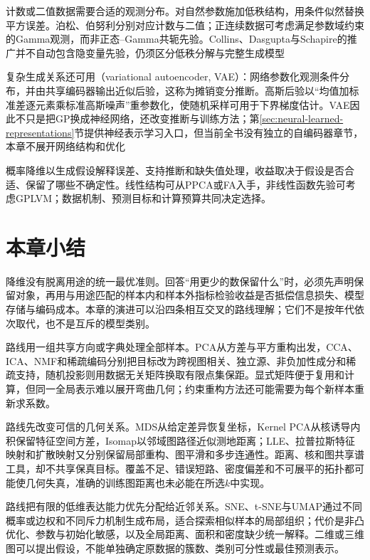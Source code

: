 计数或二值数据需要合适的观测分布。对自然参数施加低秩结构，用条件似然替换平方误差。泊松、伯努利分别对应计数与二值；正连续数据可考虑满足参数域约束的Gamma观测，而非正态--Gamma共轭先验。Collins、Dasgupta与Schapire的推广并不自动包含隐变量先验，仍须区分低秩分解与完整生成模型

复杂生成关系还可用（variational autoencoder, VAE）：网络参数化观测条件分布，并由共享编码器输出近似后验，这称为摊销变分推断。高斯后验以“均值加标准差逐元素乘标准高斯噪声”重参数化，使随机采样可用于下界梯度估计。VAE因此不只是把GP换成神经网络，还改变推断与训练方法；第\ref{sec:neural-learned-representations}节提供神经表示学习入口，但当前全书没有独立的自编码器章节，本章不展开网络结构和优化

概率降维以生成假设解释误差、支持推断和缺失值处理，收益取决于假设是否合适、保留了哪些不确定性。线性结构可从PPCA或FA入手，非线性函数先验可考虑GPLVM；数据机制、预测目标和计算预算共同决定选择。

\section{本章小结}
\label{sec:dim-summary}

降维没有脱离用途的统一最优准则。回答“用更少的数保留什么”时，必须先声明保留对象，再用与用途匹配的样本内和样本外指标检验收益是否抵偿信息损失、模型存储与编码成本。本章的演进可以沿四条相互交叉的路线理解；它们不是按年代依次取代，也不是互斥的模型类别。

路线用一组共享方向或字典处理全部样本。PCA从方差与平方重构出发，CCA、ICA、NMF和稀疏编码分别把目标改为跨视图相关、独立源、非负加性成分和稀疏支持，随机投影则用数据无关矩阵换取有限点集保距。显式矩阵便于复用和计算，但同一全局表示难以展开弯曲几何；约束重构方法还可能需要为每个新样本重新求系数。

路线先改变可信的几何关系。MDS从给定差异恢复坐标，Kernel PCA从核诱导内积保留特征空间方差，Isomap以邻域图路径近似测地距离；LLE、拉普拉斯特征映射和扩散映射又分别保留局部重构、图平滑和多步连通性。距离、核和图共享谱工具，却不共享保真目标。覆盖不足、错误短路、密度偏差和不可展平的拓扑都可能使几何失真，准确的训练图距离也未必能在所选$k$中实现。

路线把有限的低维表达能力优先分配给近邻关系。SNE、t-SNE与UMAP通过不同概率或边权和不同斥力机制生成布局，适合探索相似样本的局部组织；代价是非凸优化、参数与初始化敏感，以及全局距离、面积和密度缺少统一解释。二维或三维图可以提出假设，不能单独确定原数据的簇数、类别可分性或最佳预测表示。

